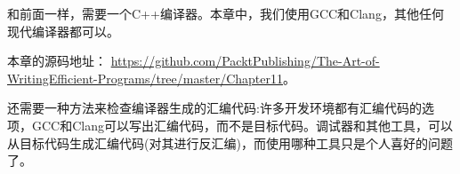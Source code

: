 和前面一样，需要一个C++编译器。本章中，我们使用GCC和Clang，其他任何现代编译器都可以。 

本章的源码地址： \url{https://github.com/PacktPublishing/The-Art-of-WritingEfficient-Programs/tree/master/Chapter11}。

还需要一种方法来检查编译器生成的汇编代码:许多开发环境都有汇编代码的选项，GCC和Clang可以写出汇编代码，而不是目标代码。调试器和其他工具，可以从目标代码生成汇编代码(对其进行反汇编)，而使用哪种工具只是个人喜好的问题了。